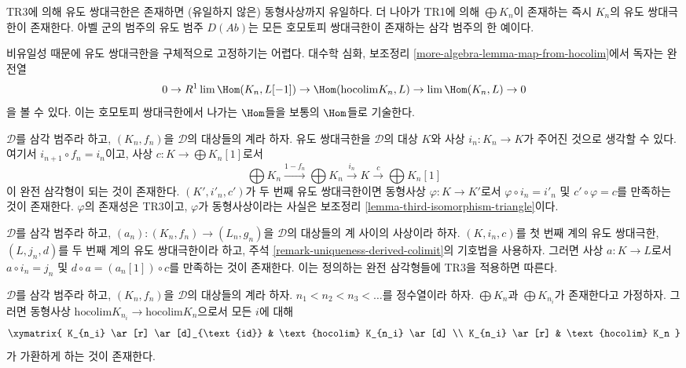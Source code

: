 \noindent
TR3에 의해 유도 쌍대극한은 존재하면 (유일하지 않은) 동형사상까지
유일하다. 더 나아가 TR1에 의해 $\bigoplus K_n$이 존재하는 즉시
$K_n$의 유도 쌍대극한이 존재한다. 아벨 군의 범주의 유도 범주
$D(\textit{Ab})$는 모든 호모토피 쌍대극한이 존재하는 삼각 범주의
한 예이다.

\medskip\noindent
비유일성 때문에 유도 쌍대극한을 구체적으로 고정하기는 어렵다.
대수학 심화, 보조정리 \ref{more-algebra-lemma-map-from-hocolim}에서
독자는 완전열
$$
0 \to R^1\lim \Hom(K_n, L[-1]) \to \Hom(\text{hocolim} K_n, L)
\to \lim \Hom(K_n, L) \to 0
$$
을 볼 수 있다. 이는 호모토피 쌍대극한에서 나가는 $\Hom$들을
보통의 $\Hom$들로 기술한다.

\begin{remark}
\label{remark-uniqueness-derived-colimit}
$\mathcal{D}$를 삼각 범주라 하고, $(K_n, f_n)$을 $\mathcal{D}$의
대상들의 계라 하자. 유도 쌍대극한을 $\mathcal{D}$의 대상 $K$와
사상 $i_n : K_n \to K$가 주어진 것으로 생각할 수 있다. 여기서
$i_{n + 1} \circ f_n = i_n$이고, 사상
$c : K \to \bigoplus K_n[1]$로서
$$
\bigoplus K_n \xrightarrow{1 - f_n} \bigoplus K_n \xrightarrow{i_n}
K \xrightarrow{c} \bigoplus K_n[1]
$$
이 완전 삼각형이 되는 것이 존재한다. $(K', i'_n, c')$가 두 번째
유도 쌍대극한이면 동형사상 $\varphi : K \to K'$로서
$\varphi \circ i_n = i'_n$ 및 $c' \circ \varphi = c$를 만족하는
것이 존재한다. $\varphi$의 존재성은 TR3이고, $\varphi$가
동형사상이라는 사실은 보조정리
\ref{lemma-third-isomorphism-triangle}이다.
\end{remark}

\begin{remark}
\label{remark-functoriality-derived-colimit}
$\mathcal{D}$를 삼각 범주라 하고,
$(a_n) : (K_n, f_n) \to (L_n, g_n)$을 $\mathcal{D}$의 대상들의
계 사이의 사상이라 하자. $(K, i_n, c)$를 첫 번째 계의 유도
쌍대극한, $(L, j_n, d)$를 두 번째 계의 유도 쌍대극한이라 하고,
주석 \ref{remark-uniqueness-derived-colimit}의 기호법을 사용하자.
그러면 사상 $a : K \to L$로서
$a \circ i_n = j_n$ 및 $d \circ a = (a_n[1]) \circ c$를 만족하는
것이 존재한다. 이는 정의하는 완전 삼각형들에 TR3을 적용하면 따른다.
\end{remark}

\begin{lemma}
\label{lemma-hocolim-subsequence}
$\mathcal{D}$를 삼각 범주라 하고, $(K_n, f_n)$을 $\mathcal{D}$의
대상들의 계라 하자. $n_1 < n_2 < n_3 < \ldots$를 정수열이라 하자.
$\bigoplus K_n$과 $\bigoplus K_{n_i}$가 존재한다고 가정하자.
그러면 동형사상
$\text{hocolim} K_{n_i} \to \text{hocolim} K_n$으로서 모든 $i$에
대해
$$
\xymatrix{
K_{n_i} \ar[r] \ar[d]_{\text{id}} & \text{hocolim} K_{n_i} \ar[d] \\
K_{n_i} \ar[r] & \text{hocolim} K_n
}
$$
가 가환하게 하는 것이 존재한다.
\end{lemma}

